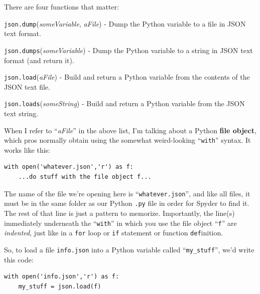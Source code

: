 There are four functions that matter:
\begin{compactitem}

\item \texttt{json.dump}(\textit{someVariable}, \textit{aFile}) - Dump the
Python variable to a file in JSON text format.

\item \texttt{json.dumps}(\textit{someVariable}) - Dump the Python
variable to a string in JSON text format (and return it).

\item \texttt{json.load}(\textit{aFile}) - Build and return a Python
variable from the contents of the JSON text file.

\label{json.loads}
\item \texttt{json.loads}(\textit{someString}) - Build and return a Python
variable from the JSON text string.

\end{compactitem}


When I refer to ``\textit{aFile}'' in the above list, I'm talking about a
Python \textbf{file object}, which pros normally obtain using the somewhat
weird-looking ``\texttt{with}'' syntax. It works like this:


\begin{Verbatim}[fontsize=\small,samepage=true,frame=single,framesep=3mm]
with open('whatever.json','r') as f:
    ...do stuff with the file object f...
\end{Verbatim}

The name of the file we're opening here is ``\texttt{whatever.json}'', and like
all files, it must be in the same folder as our Python \texttt{.py} file in
order for Spyder to find it. The rest of that line is just a pattern to
memorize. Importantly, the line(s) immediately underneath the ``\texttt{with}''
in which you use the file object ``\texttt{f}'' are \textit{indented}, just
like in a \texttt{for} loop or \texttt{if} statement or function
\texttt{def}inition.

So, to load a file \texttt{info.json} into a Python variable called
``\texttt{my\_stuff}'', we'd write this code:

\begin{Verbatim}[fontsize=\small,samepage=true,frame=single,framesep=3mm]
with open('info.json','r') as f:
    my_stuff = json.load(f)
\end{Verbatim}

